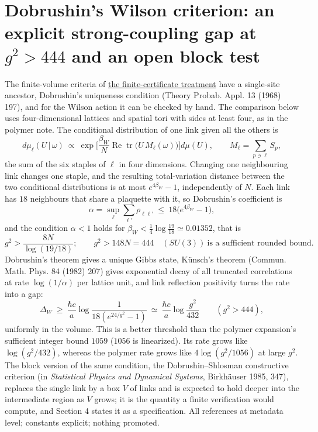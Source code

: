 \documentclass[11pt,a4paper]{article}
\begin{document}
\hypertarget{dobrushins-wilson-criterion-an-explicit-strong-coupling-gap-at-g2444-and-an-open-block-test}{%
\section{\texorpdfstring{Dobrushin's Wilson criterion: an explicit
strong-coupling gap at \(g^2>444\) and an open block
test}{Dobrushin's Wilson criterion: an explicit strong-coupling gap at g\^{}2\textgreater444 and an open block test}}\label{dobrushins-wilson-criterion-an-explicit-strong-coupling-gap-at-g2444-and-an-open-block-test}}

The finite-volume criteria of
\href{mass-gap-conditional-theorem.md\#what-a-finite-certificate-would-have-to-prove}{the
finite-certificate treatment} have a single-site ancestor, Dobrushin's
uniqueness condition (Theory Probab. Appl. 13 (1968) 197), and for the
Wilson action it can be checked by hand. The comparison below uses
four-dimensional lattices and spatial tori with sides at least four, as
in the polymer note. The conditional distribution of one link given all
the others is
\[d\mu_\ell(U\,|\,\omega)\ \propto\ \exp\Big[\frac{\beta_W}{N}\operatorname{Re}\operatorname{tr}\big(U\,M_\ell(\omega)\big)\Big]d\mu(U),
\qquad M_\ell=\sum_{p\ni\ell}S_p ,\] the sum of the six staples of
\(\ell\) in four dimensions. Changing one neighbouring link changes one
staple, and the resulting total-variation distance between the two
conditional distributions is at most \(e^{4\beta_W}-1\), independently
of \(N\). Each link has \(18\) neighbours that share a plaquette with
it, so Dobrushin's coefficient is
\[\alpha=\sup_\ell\sum_{\ell'}\rho_{\ell\ell'}\ \le\ 18\big(e^{4\beta_W}-1\big),\]
and the condition \(\alpha<1\) holds for
\(\beta_W<\tfrac14\log\tfrac{19}{18}\simeq0.01352\), that is
\[g^2>\frac{8N}{\log(19/18)};\qquad
g^2>148N=444\quad(SU(3))\ \text{is a sufficient rounded bound}.\]
Dobrushin's theorem gives a unique Gibbs state, Künsch's theorem
(Commun. Math. Phys. 84 (1982) 207) gives exponential decay of all
truncated correlations at rate \(\log(1/\alpha)\) per lattice unit, and
link reflection positivity turns the rate into a gap:
\[\Delta_W\ \ge\ \frac{\hbar c}{a}\log\frac{1}{18(e^{24/g^2}-1)}\ \simeq\ \frac{\hbar c}{a}\log\frac{g^2}{432}\qquad(g^2>444),\]
uniformly in the volume. This is a better threshold than the polymer
expansion's sufficient integer bound \(1059\) (\(1056\) is linearized).
Its rate grows like \(\log(g^2/432)\), whereas the polymer rate grows
like \(4\log(g^2/1056)\) at large \(g^2\). The block version of the same
condition, the Dobrushin--Shlosman constructive criterion (in
\emph{Statistical Physics and Dynamical Systems}, Birkhäuser 1985, 347),
replaces the single link by a box \(V\) of links and is expected to hold
deeper into the intermediate region as \(V\) grows; it is the quantity a
finite verification would compute, and Section 4 states it as a
specification. All references at metadata level; constants explicit;
nothing promoted.
\end{document}
